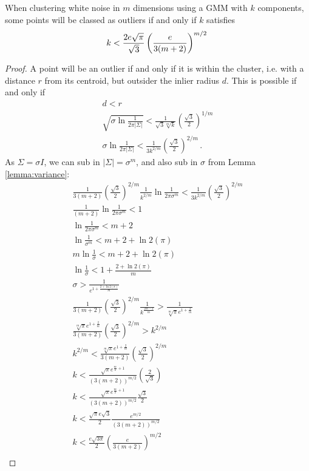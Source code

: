 \begin{lemma} \label{lemma:saturating-k}
When clustering white noise in $m$ dimensions using a GMM with $k$ components, some points will be classed as outliers if and only if $k$ satisfies
\[
k < \frac{2e\sqrt{\pi}}{\sqrt{3}}\left(\frac{e}{3(m+2)}\right)^{m/2} \\
\]
\end{lemma} \label{lemma:k-at-which-contained}
\begin{proof}
A point will be an outlier if and only if it is within the cluster, i.e. with a distance $r$ from its centroid, but outsider the inlier radius $d$. This is possible if and only if 
\begin{gather*}
    d < r \\
    \sqrt{\sigma \ln{\frac{1}{2\pi |\Sigma|}}} <\frac{1}{\sqrt{3}\sqrt[m]{k}}\left(\frac{\sqrt{3}}{2}\right)^{1/m} \\
    \sigma \ln{\frac{1}{2\pi |\Sigma|}} < \frac{1}{3k^{2/m}}\left(\frac{\sqrt{3}}{2}\right)^{2/m} \,.
\end{gather*}
As $\Sigma = \sigma I$, we can sub in $|\Sigma| = \sigma^m$, and also sub in $\sigma$ from Lemma \ref{lemma:variance}:
\begin{gather*}
    \frac{1}{3(m+2)}\left(\frac{\sqrt{3}}{2}\right)^{2/m}\frac{1}{k^{2/m}}\ln{\frac{1}{2\pi \sigma^m}} < \frac{1}{3k^{2/m}}\left(\frac{\sqrt{3}}{2}\right)^{2/m} \\
    \frac{1}{(m+2)}\ln{\frac{1}{2\pi \sigma^m}} < 1 \\
    \ln{\frac{1}{2\pi \sigma^m}} < m+2 \\
    \ln{\frac{1}{\sigma^m}} < m+2 + \ln 2{(\pi)} \\
    m\ln{\frac{1}{\sigma}} < m+2 + \ln 2{(\pi)} \\
    \ln{\frac{1}{\sigma}} < 1 + \frac{2 + \ln 2{(\pi)}}{m}   \\
    \sigma > \frac{1}{e^{1 + \frac{2 + \ln 2{(\pi)}}{m}}}   \\
    \frac{1}{3(m+2)}\left(\frac{\sqrt{3}}{2}\right)^{2/m}\frac{1}{k^{\frac{2m-2}{m}}} > \frac{1}{\sqrt[m]{\pi}e^{1 + \frac{2}{m}}}   \\
    \frac{\sqrt[m]{\pi}e^{1 + \frac{2}{m}}}{3(m+2)}\left(\frac{\sqrt{3}}{2}\right)^{2/m} > k^{2/m} \\
    k^{2/m} < \frac{\sqrt[m]{\pi}e^{1 + \frac{2}{m}}}{3(m+2)}\left(\frac{\sqrt{3}}{2}\right)^{2/m} \\
    k < \frac{\sqrt{\pi}e^{\frac{m}{2} + 1}}{(3(m+2))^{m/2}}\left(\frac{2}{\sqrt{3}}\right) \\
    k < \frac{\sqrt{\pi}e^{\frac{m}{2} + 1}}{(3(m+2))^{m/2}}\frac{\sqrt{3}}{2} \\
    k < \frac{\sqrt{\pi}e\sqrt{3}}{2}\frac{e^{m/2}}{(3(m+2))^{m/2}} \\
    k < \frac{e\sqrt{3\pi}}{2}\left(\frac{e}{3(m+2)}\right)^{m/2} \\
\end{gather*}
\end{proof}

